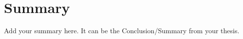 \documentclass[PhD, Submit, ngerman, UKenglish]{scrartcl}
\title{\thesistitle}
\author{\thesisauthor}
\date{\thesissubmit}
\begin{document}
\maketitle

\section*{Summary}

Add your summary here. It can be the Conclusion/Summary from your thesis.

\end{document}

